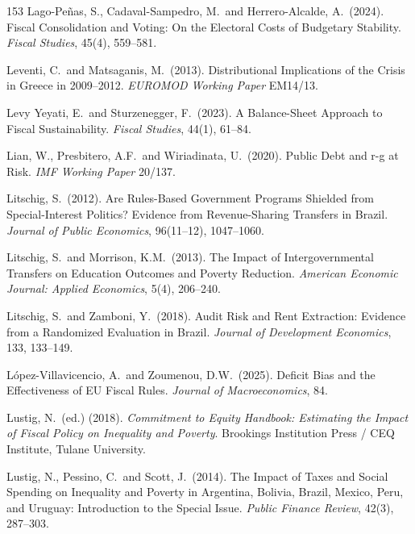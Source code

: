 \documentclass[11pt,a4paper]{article}
\begin{document}
\begin{thebibliography}{153}
 Lago-Pe\~nas, S., Cadaval-Sampedro, M.\ and Herrero-Alcalde, A.\ (2024). Fiscal Consolidation and Voting: On the Electoral Costs of Budgetary Stability. \textit{Fiscal Studies}, 45(4), 559--581.

 Leventi, C.\ and Matsaganis, M.\ (2013). Distributional Implications of the Crisis in Greece in 2009--2012. \textit{EUROMOD Working Paper} EM14/13.

 Levy Yeyati, E.\ and Sturzenegger, F.\ (2023). A Balance-Sheet Approach to Fiscal Sustainability. \textit{Fiscal Studies}, 44(1), 61--84.

 Lian, W., Presbitero, A.F.\ and Wiriadinata, U.\ (2020). Public Debt and r-g at Risk. \textit{IMF Working Paper} 20/137.

 Litschig, S.\ (2012). Are Rules-Based Government Programs Shielded from Special-Interest Politics? Evidence from Revenue-Sharing Transfers in Brazil. \textit{Journal of Public Economics}, 96(11--12), 1047--1060.

 Litschig, S.\ and Morrison, K.M.\ (2013). The Impact of Intergovernmental Transfers on Education Outcomes and Poverty Reduction. \textit{American Economic Journal: Applied Economics}, 5(4), 206--240.

 Litschig, S.\ and Zamboni, Y.\ (2018). Audit Risk and Rent Extraction: Evidence from a Randomized Evaluation in Brazil. \textit{Journal of Development Economics}, 133, 133--149.

 L\'opez-Villavicencio, A.\ and Zoumenou, D.W.\ (2025). Deficit Bias and the Effectiveness of EU Fiscal Rules. \textit{Journal of Macroeconomics}, 84.

 Lustig, N.\ (ed.) (2018). \textit{Commitment to Equity Handbook: Estimating the Impact of Fiscal Policy on Inequality and Poverty}. Brookings Institution Press / CEQ Institute, Tulane University.

 Lustig, N., Pessino, C.\ and Scott, J.\ (2014). The Impact of Taxes and Social Spending on Inequality and Poverty in Argentina, Bolivia, Brazil, Mexico, Peru, and Uruguay: Introduction to the Special Issue. \textit{Public Finance Review}, 42(3), 287--303.


\end{thebibliography}
\end{document}
